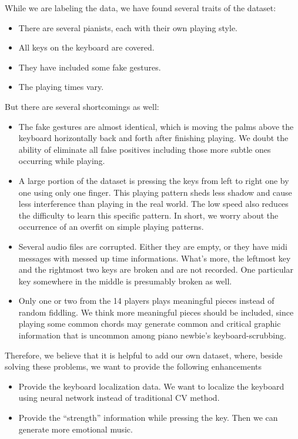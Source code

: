 \documentclass[10pt,twocolumn,letterpaper]{article}
\begin{document}
    While we are labeling the data, we have found several traits of the dataset:
    \begin{itemize}
        \item There are several pianists, each with their own playing style. 
        \item All keys on the keyboard are covered.
        \item They have included some fake gestures.
        \item The playing times vary.
    \end{itemize}

    But there are several shortcomings as well:
    \begin{itemize}
        \item The fake gestures are almost identical, which is moving the palms above the keyboard horizontally back and forth after finishing playing. We doubt the ability of eliminate all false positives including those more subtle ones occurring while playing.
        \item A large portion of the dataset is pressing the keys from left to right one by one using only one finger. This playing pattern sheds less shadow and cause less interference than playing in the real world. The low speed also reduces the difficulty to learn this specific pattern. In short, we worry about the occurrence of an overfit on simple playing patterns.
        \item Several audio files are corrupted. Either they are empty, or they have midi messages with messed up time informations. What’s more, the leftmost key and the rightmost two keys are broken and are not recorded. One particular key somewhere in the middle is presumably broken as well.
        \item Only one or two from the 14 players plays meaningful pieces instead of random fiddling. We think more meaningful pieces should be included, since playing some common chords may generate common and critical graphic information that is uncommon among piano newbie’s keyboard-scrubbing.
    \end{itemize}

    Therefore, we believe that it is helpful to add our own dataset, where, beside solving these problems, we want to provide the following enhancements
    \begin{itemize}
        \item Provide the keyboard localization data. We want to localize the keyboard using neural network instead of traditional CV method.
        \item Provide the “strength” information while pressing the key. Then we can generate more emotional music.
    \end{itemize}
\end{document}
